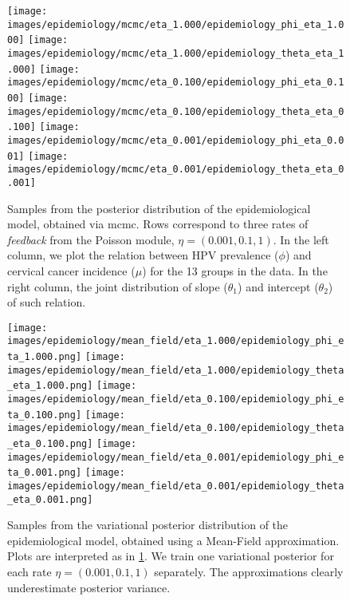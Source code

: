 \begin{figure}[ht!]
  \centering
  \texttt{[image: images/epidemiology/mcmc/eta\_1.000/epidemiology\_phi\_eta\_1.000]}
  \texttt{[image: images/epidemiology/mcmc/eta\_1.000/epidemiology\_theta\_eta\_1.000]}
  \texttt{[image: images/epidemiology/mcmc/eta\_0.100/epidemiology\_phi\_eta\_0.100]}
  \texttt{[image: images/epidemiology/mcmc/eta\_0.100/epidemiology\_theta\_eta\_0.100]}
  \texttt{[image: images/epidemiology/mcmc/eta\_0.001/epidemiology\_phi\_eta\_0.001]}
  \texttt{[image: images/epidemiology/mcmc/eta\_0.001/epidemiology\_theta\_eta\_0.001]}
  \caption[Epidemiology model MCMC]{
    Samples from the posterior distribution of the epidemiological model, obtained via \acrshort*{mcmc}.
    Rows correspond to three rates of \emph{feedback} from the Poisson module, $\eta=(0.001,0.1,1)$.
    In the left column, we plot the relation between HPV prevalence ($\phi$) and cervical cancer incidence ($\mu$) for the 13 groups in the data.
    In the right column, the joint distribution of slope ($\theta_1$) and intercept ($\theta_2$) of such relation.
  }
  \label{fig:epidemiology_mcmc}
\end{figure}


\begin{figure}[!ht]
  \centering
  \texttt{[image: images/epidemiology/mean\_field/eta\_1.000/epidemiology\_phi\_eta\_1.000.png]}
  \texttt{[image: images/epidemiology/mean\_field/eta\_1.000/epidemiology\_theta\_eta\_1.000.png]}
  \texttt{[image: images/epidemiology/mean\_field/eta\_0.100/epidemiology\_phi\_eta\_0.100.png]}
  \texttt{[image: images/epidemiology/mean\_field/eta\_0.100/epidemiology\_theta\_eta\_0.100.png]}
  \texttt{[image: images/epidemiology/mean\_field/eta\_0.001/epidemiology\_phi\_eta\_0.001.png]}
  \texttt{[image: images/epidemiology/mean\_field/eta\_0.001/epidemiology\_theta\_eta\_0.001.png]}

  \caption[Epidemiology model MFVI]{
    Samples from the variational posterior distribution of the epidemiological model, obtained using a Mean-Field approximation.
    Plots are interpreted as in \cref{fig:epidemiology_mcmc}. We train one variational posterior for each rate $\eta=(0.001,0.1,1)$ separately.
    The approximations clearly underestimate posterior variance.
  }
  \label{fig:epidemiology_mfvi}
\end{figure}

